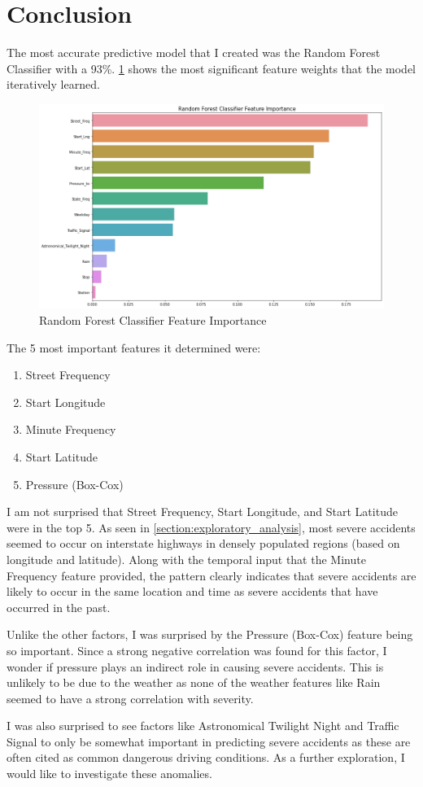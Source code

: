 \section{Conclusion}
The most accurate predictive model that I created was the Random Forest Classifier with a 93\%. \cref{fig:rf_features} shows the most significant feature weights that the model iteratively learned.

\begin{figure}[H]
    \centering
    \includegraphics[width=130mm,height=\textheight,keepaspectratio]{images/rf_features.png}
    \caption{Random Forest Classifier Feature Importance}
    \label{fig:rf_features}
\end{figure}

\noindent
The 5 most important features it determined were:
\begin{enumerate}
    \item Street Frequency
    \item Start Longitude
    \item Minute Frequency
    \item Start Latitude
    \item Pressure (Box-Cox)
\end{enumerate}

I am not surprised that Street Frequency, Start Longitude, and Start Latitude were in the top 5. As seen in \cref{section:exploratory_analysis}, most severe accidents seemed to occur on interstate highways in densely populated regions (based on longitude and latitude). Along with the temporal input that the Minute Frequency feature provided, the pattern clearly indicates that severe accidents are likely to occur in the same location and time as severe accidents that have occurred in the past.

Unlike the other factors, I was surprised by the Pressure (Box-Cox) feature being so important. Since a strong negative correlation was found for this factor, I wonder if pressure plays an indirect role in causing severe accidents. This is unlikely to be due to the weather as none of the weather features like Rain seemed to have a strong correlation with severity. 

I was also surprised to see factors like Astronomical Twilight Night and Traffic Signal to only be somewhat important in predicting severe accidents as these are often cited as common dangerous driving conditions. As a further exploration, I would like to investigate these anomalies.